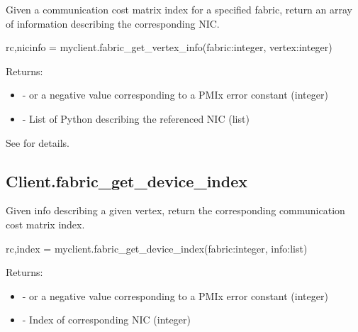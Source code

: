 \summary
Given a communication cost matrix index for a specified fabric, return an array of information describing the corresponding \ac{NIC}.

\format

\pyspecificstart
\begin{codepar}
rc,nicinfo = myclient.fabric_get_vertex_info(fabric:integer,
                        vertex:integer)
\end{codepar}
\pyspecificend


\begin{arglist}
\end{arglist}

Returns:

\begin{itemize}
    \item {} -  or a negative value corresponding to a PMIx error constant (integer)
    \item {} - List of Python  describing the referenced \ac{NIC} (list)
\end{itemize}

See  for details.


\subsection{Client.fabric_get_device_index}

\summary
Given info describing a given vertex, return the corresponding communication cost matrix index.

\format

\pyspecificstart
\begin{codepar}
rc,index = myclient.fabric_get_device_index(fabric:integer, info:list)
\end{codepar}
\pyspecificend

\begin{arglist}
\end{arglist}

Returns:

\begin{itemize}
    \item {} -  or a negative value corresponding to a PMIx error constant (integer)
    \item {} - Index of corresponding \ac{NIC} (integer)
\end{itemize}

